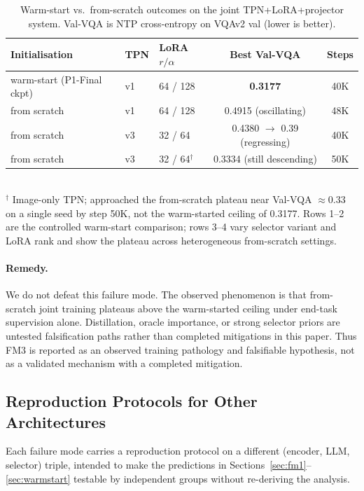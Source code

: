 \documentclass[runningheads]{llncs}
\begin{document}
\begin{table}[t]
\caption{Warm-start vs.\ from-scratch outcomes on the joint
TPN+LoRA+projector system. Val-VQA is NTP cross-entropy on VQAv2 val
(lower is better).}
\label{tab:warmstart}
\centering
\small
\renewcommand{\arraystretch}{1.05}
\begin{tabular}{lllcc}
\toprule
\textbf{Initialisation} & \textbf{TPN} & \textbf{LoRA $r/\alpha$} & \textbf{Best Val-VQA} & \textbf{Steps} \\
\midrule
warm-start (P1-Final ckpt) & v1 & 64 / 128 & \textbf{0.3177} & 40K \\
from scratch               & v1 & 64 / 128 & 0.4915 (oscillating)            & 48K \\
from scratch               & v3 & 32 / 64  & 0.4380 $\to$ 0.39 (regressing)  & 40K \\
from scratch               & v3 & 32 / 64$^\dagger$ & 0.3334 (still descending) & 50K \\
\bottomrule
\end{tabular}\\[2pt]
{\footnotesize $^\dagger$ Image-only TPN; approached the from-scratch
plateau near Val-VQA $\approx 0.33$ on a single seed by step 50K, not
the warm-started ceiling of 0.3177. Rows 1--2 are the controlled
warm-start comparison; rows 3--4 vary selector variant and LoRA rank
and show the plateau across heterogeneous from-scratch settings.}
\end{table}

\paragraph{Remedy.}
We do not defeat this failure mode. The observed phenomenon is that
from-scratch joint training plateaus above the warm-started ceiling
under end-task supervision alone. Distillation, oracle importance, or
strong selector priors are untested falsification paths rather than
completed mitigations in this paper.
Thus FM3 is reported as an observed training pathology and falsifiable
hypothesis, not as a validated mechanism with a completed mitigation.

\subsection{Reproduction Protocols for Other Architectures}
\label{sec:portability}

Each failure mode carries a reproduction protocol on a different
(encoder, LLM, selector) triple, intended to make the predictions in
Sections~\ref{sec:fm1}--\ref{sec:warmstart} testable by independent
groups without re-deriving the analysis.
\end{document}
